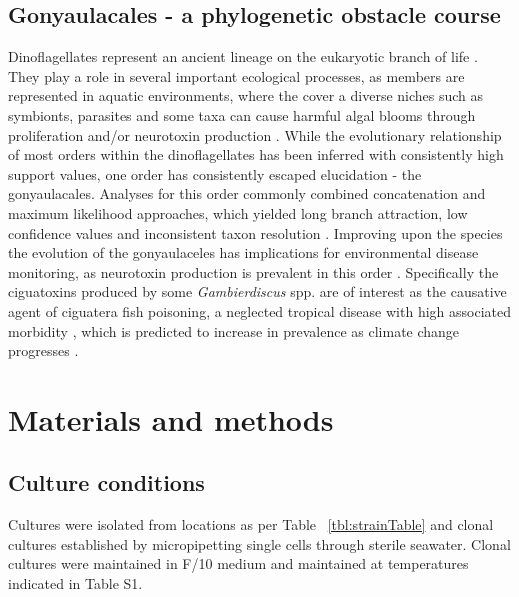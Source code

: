 \documentclass[12pt]{article}
\begin{document}
\subsection*{Gonyaulacales - a phylogenetic obstacle course}
Dinoflagellates represent an ancient lineage on the eukaryotic branch of life \cite{moldowan1998biogeochemical}. 
They play a role in several important ecological processes, as members are represented in aquatic environments, where the cover a diverse niches such as symbionts, parasites and some taxa can cause harmful algal blooms through proliferation and/or neurotoxin production \cite{murray2016unravelling}.
While the evolutionary relationship of most orders within the dinoflagellates has been inferred with consistently high support values, one order has consistently escaped elucidation - the gonyaulacales. 
Analyses for this order commonly combined concatenation and maximum likelihood approaches, which yielded long branch attraction, low confidence values and inconsistent taxon resolution \cite{}. 
Improving upon the species the evolution of the gonyaulaceles has implications for environmental disease monitoring, as neurotoxin production is prevalent in this order \cite{}. 
Specifically the ciguatoxins produced by some \emph{Gambierdiscus} spp. are of interest as the causative agent of ciguatera fish poisoning, a neglected tropical disease with high associated morbidity \cite{}, which is predicted to increase in prevalence as climate change progresses \cite{}.
\newpage
\section{Materials and methods}
\subsection*{Culture conditions}
\FloatBarrier
Cultures were isolated from locations as per Table ~\ref{tbl:strainTable} and clonal cultures established by micropipetting single cells through sterile seawater. 
Clonal cultures were maintained in F/10 medium and maintained at temperatures indicated in Table S1. 
\end{document}

